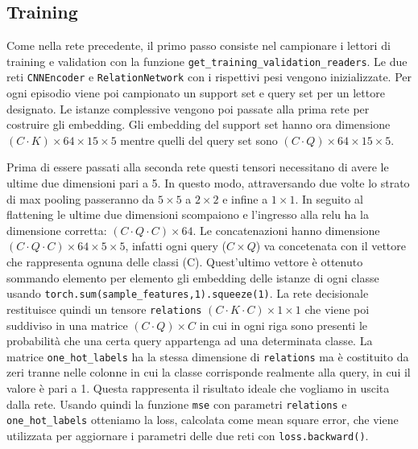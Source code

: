 \documentclass[12pt,a4paper,titlepage]{article}
\begin{document}
\subsection{Training}
Come nella rete precedente, il primo passo consiste nel campionare i lettori di training e validation con la funzione \texttt{get\_training\_validation\_readers}.
Le due reti \texttt{CNNEncoder} e \texttt{RelationNetwork} con i rispettivi pesi vengono inizializzate.
Per ogni episodio viene poi campionato un support set e query set per un lettore designato.
Le istanze complessive vengono poi passate alla prima rete per costruire gli embedding.
Gli embedding del support set hanno ora dimensione $(C\cdot K)\times64 \times 15 \times 5$ mentre quelli del query set sono $(C\cdot Q)\times64 \times 15 \times 5$.

Prima di essere passati alla seconda rete questi tensori necessitano di avere le ultime due dimensioni pari a 5.
In questo modo, attraversando due volte lo strato di max pooling passeranno da $5 \times 5$ a $2 \times 2$ e infine a $1 \times 1$.
In seguito al flattening le ultime due dimensioni scompaiono e l'ingresso alla relu ha la dimensione corretta: $(C\cdot Q \cdot C)\times 64$.
Le concatenazioni hanno dimensione $(C\cdot Q \cdot C)\times 64 \times 5 \times 5$, infatti ogni query ($C \times Q$) va concetenata con il vettore che rappresenta ognuna delle classi (C).
Quest'ultimo vettore è ottenuto sommando elemento per elemento gli embedding delle istanze di ogni classe usando \texttt{torch.sum(sample\_features,1).squeeze(1)}.
La rete decisionale restituisce quindi un tensore \texttt{relations} $(C \cdot K \cdot C) \times 1 \times 1$  che viene poi suddiviso in una matrice $(C \cdot Q) \times C$ in cui in ogni riga sono presenti le probabilità che una certa query appartenga ad una determinata classe.
La matrice \texttt{one\_hot\_labels} ha la stessa dimensione di \texttt{relations} ma è costituito da zeri tranne nelle colonne in cui la classe corrisponde realmente alla query, in cui il valore è pari a 1.
Questa rappresenta il risultato ideale che vogliamo in uscita dalla rete.
Usando quindi la funzione \texttt{mse} con parametri \texttt{relations} e \texttt{one\_hot\_labels} otteniamo la loss, calcolata come mean square error, che viene utilizzata per aggiornare i parametri delle due reti con \texttt{loss.backward()}.
\end{document}
